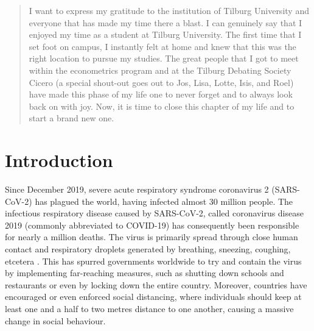 \documentclass[12pt]{article}
\newenvironment{acknowledgements}{\renewcommand\abstractname{Acknowledgements}\begin{abstract}} {\end{abstract}}
\begin{document}
\begin{acknowledgements}
		I want to express my gratitude to the institution of Tilburg University and everyone that has made my time there a blast. I can genuinely say that I enjoyed my time as a student at Tilburg University. The first time that I set foot on campus, I instantly felt at home and knew that this was the right location to pursue my studies. The great people that I got to meet within the econometrics program and at the Tilburg Debating Society Cicero (a special shout-out goes out to Jos, Lisa, Lotte, Isis, and Roel) have made this phase of my life one to never forget and to always look back on with joy. Now, it is time to close this chapter of my life and to start a brand new one.
		
	\end{acknowledgements}
	
	\newpage
	
	\tableofcontents
	
	\newpage
	
	\section{Introduction} \label{sec:introduction}
	Since December 2019, severe acute respiratory syndrome coronavirus 2 (SARS-CoV-2) has plagued the world, having infected almost 30 million people. The infectious respiratory disease caused by SARS-CoV-2, called coronavirus disease 2019 (commonly abbreviated to COVID-19) has consequently been responsible for nearly a million deaths. The virus is primarily spread through close human contact and respiratory droplets generated by breathing, sneezing, coughing, etcetera \parencite{ecdc2020transmission}. This has spurred governments worldwide to try and contain the virus by implementing far-reaching measures, such as shutting down schools and restaurants or even by locking down the entire country. Moreover, countries have encouraged or even enforced social distancing, where individuals should keep at least one and a half to two metres distance to one another, causing a massive change in social behaviour.
	\\
\end{document}
